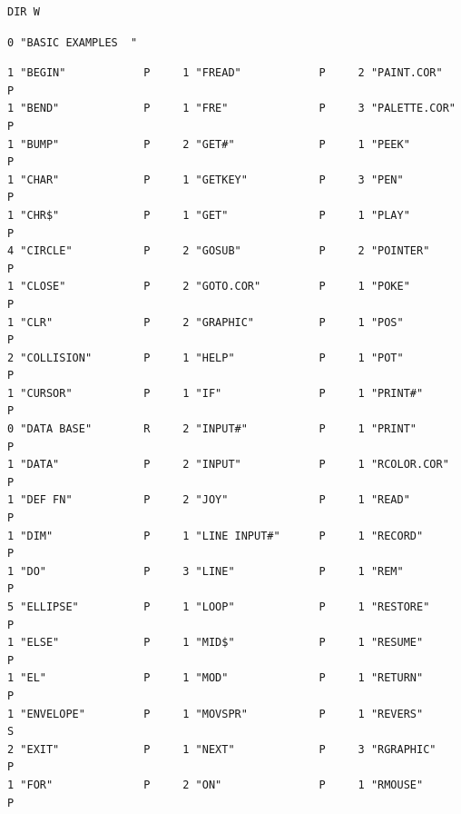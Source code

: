 \begin{description}[leftmargin=2cm,style=nextline]
\begin{tcolorbox}[colback=black,coltext=white]
\verbatimfont{\codefont}
\begin{verbatim}
DIR W
\end{verbatim}
\begin{tcolorbox}[colback=white,coltext=black,arc=0mm,boxrule=0mm,
left*=0.5mm,right*=0mm,top=0mm,bottom=0mm,nobeforeafter,
left skip=0.5mm,
width=28mm,height=3mm,valign=center]
\begin{verbatim}
0 "BASIC EXAMPLES  "
\end{verbatim}
\end{tcolorbox}
\begin{verbatim}
1 "BEGIN"            P     1 "FREAD"            P     2 "PAINT.COR"        P
1 "BEND"             P     1 "FRE"              P     3 "PALETTE.COR"      P
1 "BUMP"             P     2 "GET#"             P     1 "PEEK"             P
1 "CHAR"             P     1 "GETKEY"           P     3 "PEN"              P
1 "CHR$"             P     1 "GET"              P     1 "PLAY"             P
4 "CIRCLE"           P     2 "GOSUB"            P     2 "POINTER"          P
1 "CLOSE"            P     2 "GOTO.COR"         P     1 "POKE"             P
1 "CLR"              P     2 "GRAPHIC"          P     1 "POS"              P
2 "COLLISION"        P     1 "HELP"             P     1 "POT"              P
1 "CURSOR"           P     1 "IF"               P     1 "PRINT#"           P
0 "DATA BASE"        R     2 "INPUT#"           P     1 "PRINT"            P
1 "DATA"             P     2 "INPUT"            P     1 "RCOLOR.COR"       P
1 "DEF FN"           P     2 "JOY"              P     1 "READ"             P
1 "DIM"              P     1 "LINE INPUT#"      P     1 "RECORD"           P
1 "DO"               P     3 "LINE"             P     1 "REM"              P
5 "ELLIPSE"          P     1 "LOOP"             P     1 "RESTORE"          P
1 "ELSE"             P     1 "MID$"             P     1 "RESUME"           P
1 "EL"               P     1 "MOD"              P     1 "RETURN"           P
1 "ENVELOPE"         P     1 "MOVSPR"           P     1 "REVERS"           S
2 "EXIT"             P     1 "NEXT"             P     3 "RGRAPHIC"         P
1 "FOR"              P     2 "ON"               P     1 "RMOUSE"           P
\end{verbatim}
\end{tcolorbox}

\end{description}



